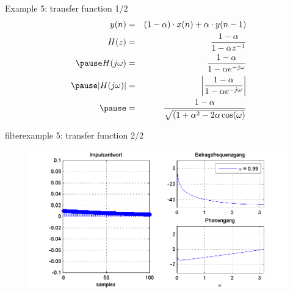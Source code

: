 	\begin{frame}{Example 5: transfer function 1/2}
    	\begin{eqnarray}
        		y(n) &=& (1-\alpha)\cdot x(n) + \alpha\cdot y(n-1)\\
        		H(z) &=& \frac{1-\alpha}{1-\alpha z^{-1}}\\
        \pause
        		H(j\omega) &=& \frac{1-\alpha}{1-\alpha e^{-j\omega}}\\
        \pause
        		|H(j\omega)| &=& \left|\frac{1-\alpha}{1-\alpha e^{-j\omega}}\right| \\
        \pause
        		&=&\frac{1-\alpha}{\sqrt{(1 + \alpha^2 - 2\alpha\cos(\omega)}} 
    	\end{eqnarray}
	\end{frame}
	\begin{frame}{filter}{example 5: transfer function 2/2}
		\begin{figure}
			\centerline{\includegraphics[scale=.5]{graph/fx_05}}
		\end{figure}
	\end{frame}
